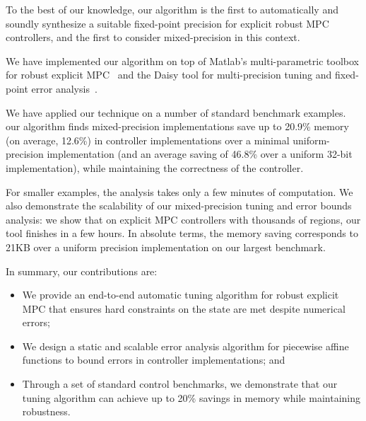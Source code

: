 To the best of our knowledge, our algorithm is the first to automatically and soundly
synthesize a suitable fixed-point precision for explicit robust MPC controllers,
and the first to consider mixed-precision in this context.

We have implemented our algorithm on top of Matlab's multi-parametric toolbox 
for robust explicit MPC~\cite{matlabMPT}
and the Daisy tool for multi-precision tuning and fixed-point error analysis~\cite{Daisy}. %

We have applied our technique on a number of standard benchmark examples. 
our algorithm finds mixed-precision implementations  save up to 20.9\%
memory (on average, 12.6\%) in controller implementations over a minimal
uniform-precision implementation (and an average saving of 46.8\% over a uniform
32-bit implementation), while maintaining the correctness of the controller.

For smaller examples, the analysis takes only a few minutes of computation.
We also demonstrate the scalability of our mixed-precision tuning and error bounds analysis:
we show that on explicit MPC controllers with thousands of regions, our tool finishes in a few hours.
In absolute terms, the memory saving corresponds to 21KB over a uniform
precision implementation on our largest benchmark. %

In summary, our contributions are:
\begin{itemize}
\item We provide an end-to-end automatic tuning algorithm for robust explicit MPC that ensures 
hard constraints on the state are met despite numerical errors;
\item We design a static and scalable error analysis algorithm for piecewise affine functions to bound
errors in controller implementations; and
\item Through a set of standard control benchmarks, we demonstrate that our tuning algorithm
can achieve up to 20\% savings in memory while maintaining robustness.
\end{itemize} 

